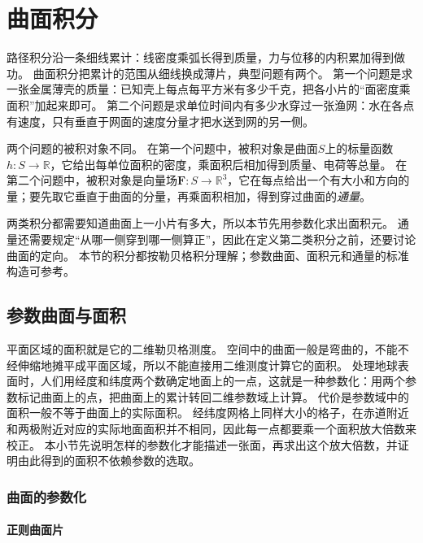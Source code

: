 \par{}
\section{曲面积分}
\label{sec:analysis-surface-integration}

路径积分沿一条细线累计：线密度乘弧长得到质量，力与位移的内积累加得到做功。
曲面积分把累计的范围从细线换成薄片，典型问题有两个。
第一个问题是求一张金属薄壳的质量：已知壳上每点每平方米有多少千克，把各小片的“面密度乘面积”加起来即可。
第二个问题是求单位时间内有多少水穿过一张渔网：水在各点有速度，只有垂直于网面的速度分量才把水送到网的另一侧。

两个问题的被积对象不同。
在第一个问题中，被积对象是曲面$S$上的标量函数$h:S\to\mathbb R$，它给出每单位面积的密度，乘面积后相加得到质量、电荷等总量。
在第二个问题中，被积对象是向量场$\bm F:S\to\mathbb R^3$，它在每点给出一个有大小和方向的量；要先取它垂直于曲面的分量，再乘面积相加，得到穿过曲面的\emph{通量}。

两类积分都需要知道曲面上一小片有多大，所以本节先用参数化求出面积元。
通量还需要规定“从哪一侧穿到哪一侧算正”，因此在定义第二类积分之前，还要讨论曲面的定向。
本节的积分都按勒贝格积分理解；参数曲面、面积元和通量的标准构造可参考。

\subsection{参数曲面与面积}

平面区域的面积就是它的二维勒贝格测度。
空间中的曲面一般是弯曲的，不能不经伸缩地摊平成平面区域，所以不能直接用二维测度计算它的面积。
处理地球表面时，人们用经度和纬度两个数确定地面上的一点，这就是一种参数化：用两个参数标记曲面上的点，把曲面上的累计转回二维参数域上计算。
代价是参数域中的面积一般不等于曲面上的实际面积。
经纬度网格上同样大小的格子，在赤道附近和两极附近对应的实际地面面积并不相同，因此每一点都要乘一个面积放大倍数来校正。
本小节先说明怎样的参数化才能描述一张面，再求出这个放大倍数，并证明由此得到的面积不依赖参数的选取。

\subsubsection{曲面的参数化}

\paragraph{正则曲面片}


